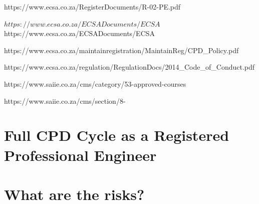 \documentclass[11pt,a4paper]{article}
\begin{document}
		https://www.ecsa.co.za/RegisterDocuments/R-02-PE.pdf
		
		$https://www.ecsa.co.za/ECSADocuments/ECSA%
		
		$https://www.ecsa.co.za/ECSADocuments/ECSA%
		
		https://www.ecsa.co.za/maintainregistration/MaintainReg/CPD_Policy.pdf
		
		https://www.ecsa.co.za/regulation/RegulationDocs/2014_Code_of_Conduct.pdf
		
		https://www.saiie.co.za/cms/category/53-approved-courses
		
		https://www.saiie.co.za/cms/section/8-
	
	\section{Full CPD Cycle as a Registered Professional Engineer}
	
	\section{What are the risks?}
				
\end{document}
